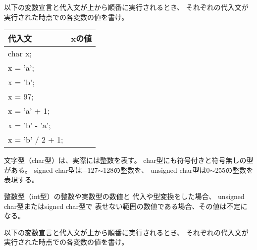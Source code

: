 \documentclass[12pt,a4j]{jarticle}
\newcounter{toi}
\def\toi{%
\bigskip\bigskip\noindent
\addtocounter{toi}{1}
\shadowbox{\bfseries\large 問\thetoi}
\nopagebreak[4]\bigskip\nopagebreak[4]
}
\begin{document}
以下の変数宣言と代入文が上から順番に実行されるとき、
それぞれの代入文が実行された時点での各変数の値を書け。
\begin{center}
 \ttfamily%
 \begin{tabular}{|l|c|}\hline
 代入文   & xの値 \\ \hline\hline
 char x;  &       \\  \cline{2-2}
 x = 'a'; &      \\  \cline{2-2}
 x = 'b'; &       \\  \cline{2-2}
 x = 97;  &       \\  \cline{2-2}
 x = 'a' + 1;      & \\  \cline{2-2}
 x = 'b' - 'a';    & \\  \cline{2-2}
 x = 'b' / 2 + 1;  & \\ \hline
 \end{tabular}
\end{center}




\toi


文字型（char型）は、実際には整数を表す。
char型にも符号付きと符号無しの型がある。
signed char型は$-$127$\sim$128の整数を、
unsigned char型は0$\sim$255の整数を表現する。

整数型（int型）の整数や実数型の数値と
代入や型変換をした場合、
unsigned char型またはsigned char型で
表せない範囲の数値である場合、その値は不定になる。


以下の変数宣言と代入文が上から順番に実行されるとき、
それぞれの代入文が実行された時点での各変数の値を書け。
\begin{center}
\end{center}
\end{document}
